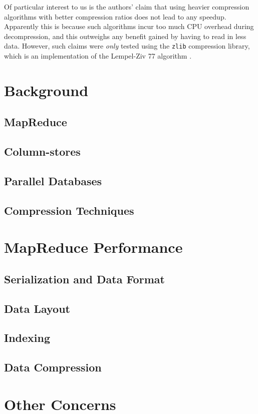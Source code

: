 \documentclass[twocolumn]{article}
\begin{document}
Of particular interest to us is the authors' claim that using heavier compression
algorithms with better compression ratios does not lead to any speedup.  Apparently
this is because such algorithms incur too much CPU overhead during decompression,
and this outweighs any benefit gained by having to read in less data.  However,
such claims were \emph{only} tested using the \verb+zlib+ compression library,
which is an implementation of the Lempel-Ziv 77 algorithm \cite{ref:lz77}.

\section{Background}
\subsection{MapReduce}
\subsection{Column-stores}
\subsection{Parallel Databases}
\subsection{Compression Techniques}

\section{MapReduce Performance}
\subsection{Serialization and Data Format}
\subsection{Data Layout}
\subsection{Indexing}
\subsection{Data Compression}

\section{Other Concerns}
\end{document}
